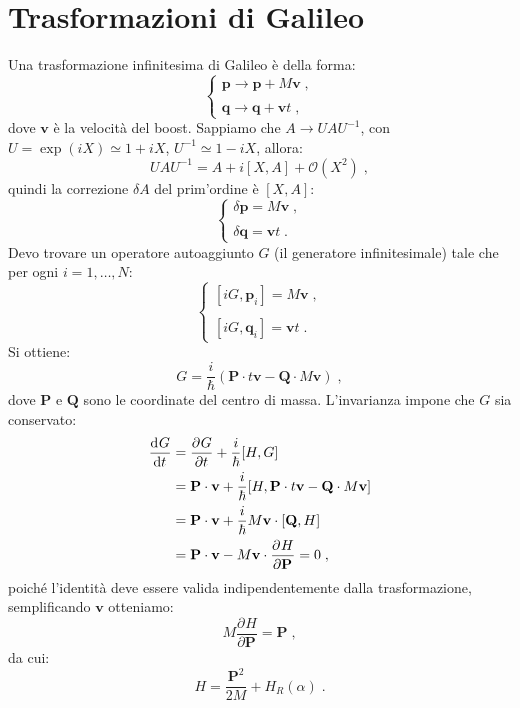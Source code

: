 \documentclass[12pt,a4paper]{report}
\theoremstyle{definition}
\newcommand{\pdev}[3][]{\frac{\partial^{#1} #2}{\partial #3^{#1}}}
\newcommand{\dev}[3][]{\frac{\mathrm{d}^{#1} #2}{\mathrm{d} #3^{#1}}}
\numberwithin{equation}{section}
\begin{document}
\section{Trasformazioni di Galileo}
Una trasformazione infinitesima di Galileo è della forma:
\begin{equation}
\begin{cases}
\mathbf{p}\to \mathbf{p}+M\mathbf{v}\;, \\
\\
\mathbf{q}\to \mathbf{q}+\mathbf{v}t\;,
\end{cases}
\end{equation}
dove $\mathbf{v}$ è la velocità del boost. Sappiamo che $A\to UAU^{-1}$, con $U=\exp(iX)\simeq 1+iX$, $U^{-1}\simeq 1-iX$, allora:
\begin{equation}
UAU^{-1}=A+i[X,A]+\mathcal{O}(X^2)\;,
\end{equation}
quindi la correzione $\delta A$ del prim'ordine è $[X,A]$:
\begin{equation}
\begin{cases}
\delta\mathbf{p}=M\mathbf{v}\;, \\
\\
\delta\mathbf{q}=\mathbf{v}t\;.
\end{cases}
\end{equation}
Devo trovare un operatore autoaggiunto $G$ (il generatore infinitesimale) tale che per ogni $i=1,\ldots,N$:
\begin{equation}
\begin{cases}
[iG,\mathbf{p}_i]=M\mathbf{v}\;, \\
\\
[iG,\mathbf{q}_i]=\mathbf{v}t\;.
\end{cases}
\end{equation}
Si ottiene:
\begin{equation}
G=\frac{i}{\hbar}(\mathbf{P}\cdot t\mathbf{v}-\mathbf{Q}\cdot M\mathbf{v})\;,
\end{equation}
dove $\mathbf{P}$ e $\mathbf{Q}$ sono le coordinate del centro di massa. L'invarianza impone che $G$ sia conservato:
\begin{align}
\dev{G}{t} &=\pdev{G}{t}+\frac{i}{\hbar}[H,G] \notag \\
&= \mathbf{P}\cdot \mathbf{v}+\frac{i}{\hbar}[H,\mathbf{P}\cdot t\mathbf{v}-\mathbf{Q}\cdot M\mathbf{v}] \notag \\
&= \mathbf{P}\cdot \mathbf{v}+\frac{i}{\hbar}M\mathbf{v}\cdot [\mathbf{Q},H] \notag \\
&= \mathbf{P}\cdot \mathbf{v}-M\mathbf{v}\cdot \pdev{H}{\mathbf{P}}=0\;,
\end{align}
poiché l'identità deve essere valida indipendentemente dalla trasformazione, semplificando $\mathbf{v}$ otteniamo:
\begin{equation}
M\pdev{H}{\mathbf{P}}=\mathbf{P}\;,
\end{equation}
da cui:
\begin{equation}
H=\frac{\mathbf{P}^2}{2M}+H_R(\alpha)\;.
\end{equation}
\end{document}
